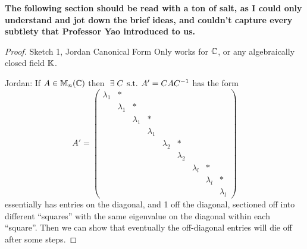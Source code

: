 \textbf{The following section should be read with a ton of salt, as I could only understand and jot down the brief ideas, and couldn't capture every subtlety that Professor Yao introduced to us.}


\begin{proof} {Sketch 1, Jordan Canonical Form}
    Only works for \(\mathbb{C}\), or any algebraically closed field \(\mathbb{K}\).

    Jordan: If \(A \in \mathbb{M}_n(\mathbb{C})\) then \(\exists C \st A' = CAC^{-1}\) has the form \[
        A' = \begin{pmatrix}
            \lambda_1 & \ast      &           &           &           &           &           &           &           \\
                      & \lambda_1 & \ast      &           &           &           &           &           &           \\
                      &           & \lambda_1 & \ast      &           &           &           &           &           \\
                      &           &           & \lambda_1 &           &           &           &           &           \\
                      &           &           &           & \lambda_2 & \ast      &           &           &           \\
                      &           &           &           &           & \lambda_2 &           &           &           \\
                      &           &           &           &           &           & \lambda_l & \ast      &           \\
                      &           &           &           &           &           &           & \lambda_l & \ast      \\
                      &           &           &           &           &           &           &           & \lambda_l
        \end{pmatrix}
    \]
    essentially has entries on the diagonal, and 1 off the diagonal, sectioned off into different ``squares'' with the same eigenvalue on the diagonal within each ``square''. Then we can show that eventually the off-diagonal entries will die off after some steps.
\end{proof}

